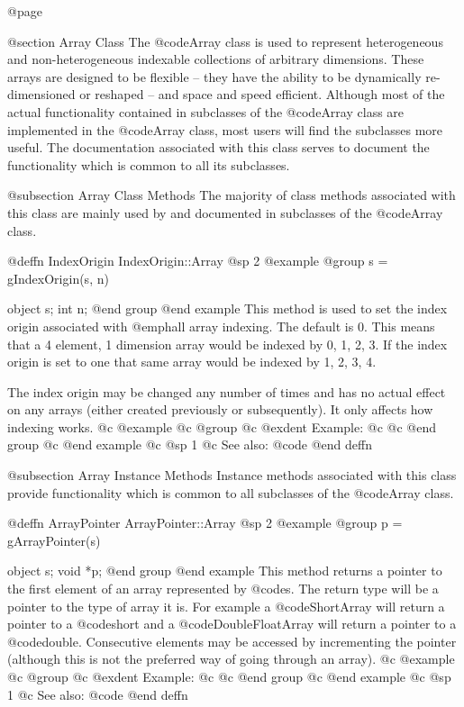 @page

@section Array Class
The @code{Array} class is used to represent heterogeneous and
non-heterogeneous indexable collections of arbitrary dimensions.  These
arrays are designed to be flexible -- they have the ability to be
dynamically re-dimensioned or reshaped -- and space and speed efficient.
Although most of the actual functionality contained in subclasses of the
@code{Array} class are implemented in the @code{Array} class, most users
will find the subclasses more useful.  The documentation associated with
this class serves to document the functionality which is common to all
its subclasses.



@subsection Array Class Methods
The majority of class methods associated with this class are mainly used
by and documented in subclasses of the @code{Array} class.





@deffn {IndexOrigin} IndexOrigin::Array
@sp 2
@example
@group
s = gIndexOrigin(s, n)

object  s;
int     n;
@end group
@end example
This method is used to set the index origin associated with @emph{all}
array indexing.  The default is 0.  This means that a 4 element, 1
dimension array would be indexed by 0, 1, 2, 3.  If the index origin
is set to one that same array would be indexed by 1, 2, 3, 4.

The index origin may be changed any number of times and has no actual effect
on any arrays (either created previously or subsequently).  It only
affects how indexing works.
@c @example
@c @group
@c @exdent Example:
@c 
@c @end group
@c @end example
@c @sp 1
@c See also:  @code{}
@end deffn






@subsection Array Instance Methods
Instance methods associated with this class provide functionality which
is common to all subclasses of the @code{Array} class.








@deffn {ArrayPointer} ArrayPointer::Array
@sp 2
@example
@group
p = gArrayPointer(s)

object  s;
void    *p;
@end group
@end example
This method returns a pointer to the first element of an array represented
by @code{s}.  The return type will be a pointer to the type of array it
is.  For example a @code{ShortArray} will return a pointer to a @code{short}
and a @code{DoubleFloatArray} will return a pointer to a @code{double}.
Consecutive elements may be accessed by incrementing the pointer (although
this is not the preferred way of going through an array).
@c @example
@c @group
@c @exdent Example:
@c 
@c @end group
@c @end example
@c @sp 1
@c See also:  @code{}
@end deffn









